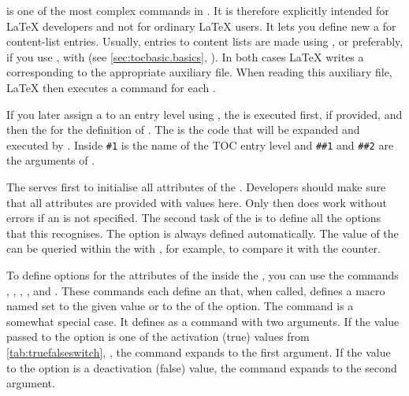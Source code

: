  is
one of the most complex commands in \KOMAScript. It is therefore explicitly
intended for \LaTeX{} developers and not for ordinary \LaTeX{} users. It lets
you define new a  for content-list entries. Usually, entries to
content lists are made using
, or preferably, if you use
, with
 (see
\autoref{sec:tocbasic.basics}, ).
In both cases \LaTeX{} writes a corresponding
 to the appropriate auxiliary file.
When reading this auxiliary file, \LaTeX{} then executes a
 command for each .

If you later assign a  to an entry level using
, the  is
executed first, if provided, and then the  for the
definition of . The  is the
code that will be expanded and executed by .
Inside  \texttt{\#1} is the name of the TOC entry level
and \texttt{\#\#1} and \texttt{\#\#2} are the arguments of
.

The  serves first to initialise all attributes of the
. Developers should make sure that all attributes are provided
with values here. Only then does 
work without errors if an  is not specified. The second
task of the  is to define all the options that this
 recognises. The  option is always defined
automatically. The value of the  can be queried within the
 with %
, for example, to compare it
with the  counter.

To define options for the attributes of the  inside the
, you can use the commands
, ,
, , and
.  These commands each define an
 that, when called, defines a macro named
 set to the given
value or to the  of the option. The
 command is a somewhat special case. It defines
 as a command with two
arguments. If the value passed to the option is one of the activation (true)
values from \autoref{tab:truefalseswitch}, ,
the command expands to the first argument. If the value to the option is a
deactivation (false) value, the command expands to the second argument.


